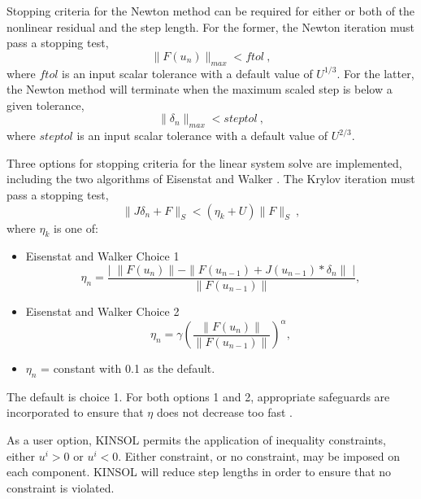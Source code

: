 Stopping criteria for the Newton method can be required for either or 
both of the nonlinear residual and the step length.  For the former, 
the Newton iteration must pass a stopping test,
\[ \|F(u_n)\|_{max} < ftol ~, \]
where $ftol$ is an input scalar tolerance with a default value of $U^{1/3}$.
For the latter, the Newton method will terminate when the maximum scaled step
is below a given tolerance,
\[ \|\delta_n\|_{max} < steptol ~, \]
where $steptol$ is an input scalar tolerance with a default value of 
$U^{2/3}$.

Three options for stopping criteria for the linear system solve are
implemented, including the two 
algorithms of Eisenstat and Walker \cite{EiWa:96}.
The Krylov iteration must pass a stopping test,
\[ \|J \delta_n + F\|_S < (\eta_k + U) \|F\|_S ~, \]
where $\eta_k$ is one of:
\begin{itemize}
\item Eisenstat and Walker Choice 1
\[ \eta_n = \frac{\left|\; \|F(u_n)\|  
                           - \|F(u_{n-1}) + J(u_{n-1}) * \delta_n \| 
                  \; \right|}
               {\|F(u_{n-1})\|},  \]
\item Eisenstat and Walker Choice 2
\[ \eta_n = \gamma \left( \frac{ \|F(u_n)\|}{\|F(u_{n-1})\|} \right)^{\alpha},
\] 
\item  $\eta_n$ = constant with 0.1 as the default.
\end{itemize}
The default is choice 1.  For both options 1 and 2, appropriate 
safeguards are incorporated to ensure that $\eta$ does not decrease 
too fast \cite{EiWa:96}.

As a user option, KINSOL permits the application of inequality
constraints, either $u^i > 0$ or $u^i < 0$.  Either constraint, or
no constraint, may be imposed on each component.  KINSOL will reduce 
step lengths in order to ensure that no constraint is violated.


